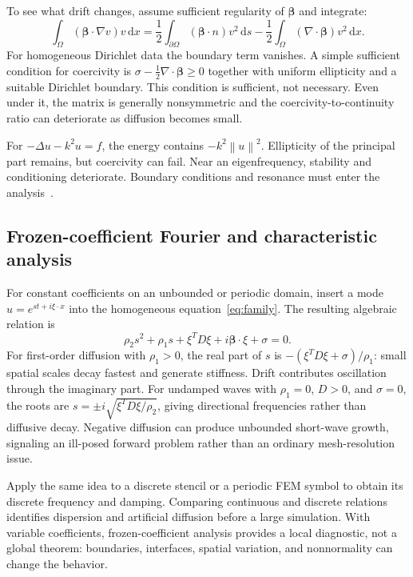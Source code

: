 \documentclass[11pt,a4paper]{article}
\newcommand{\dd}{\,\mathrm{d}}
\newcommand{\norm}[1]{\left\lVert #1\right\rVert}
\begin{document}
To see what drift changes, assume sufficient regularity of $\boldsymbol\beta$ and integrate:
\begin{equation}\label{eq:driftenergy}
\int_\Omega(\boldsymbol\beta\cdot\nabla v)v\dd x
=\frac12\int_{\partial\Omega}(\boldsymbol\beta\cdot n)v^2\dd s
-\frac12\int_\Omega(\nabla\cdot\boldsymbol\beta)v^2\dd x.
\end{equation}
For homogeneous Dirichlet data the boundary term vanishes. A simple sufficient condition for coercivity is $\sigma-\tfrac12\nabla\cdot\boldsymbol\beta\ge0$ together with uniform ellipticity and a suitable Dirichlet boundary. This condition is sufficient, not necessary. Even under it, the matrix is generally nonsymmetric and the coercivity-to-continuity ratio can deteriorate as diffusion becomes small.

For $-\Delta u-k^2u=f$, the energy contains $-k^2\norm{u}^2$. Ellipticity of the principal part remains, but coercivity can fail. Near an eigenfrequency, stability and conditioning deteriorate. Boundary conditions and resonance must enter the analysis~\cite{melenk}.

\subsection{Frozen-coefficient Fourier and characteristic analysis}
For constant coefficients on an unbounded or periodic domain, insert a mode $u=e^{st+i\xi\cdot x}$ into the homogeneous equation~\eqref{eq:family}. The resulting algebraic relation is
\begin{equation}\label{eq:fourier}
\rho_2s^2+\rho_1s+\xi^TD\xi
+i\boldsymbol\beta\cdot\xi+\sigma=0.
\end{equation}
For first-order diffusion with $\rho_1>0$, the real part of $s$ is $-(\xi^TD\xi+\sigma)/\rho_1$: small spatial scales decay fastest and generate stiffness. Drift contributes oscillation through the imaginary part. For undamped waves with $\rho_1=0$, $D>0$, and $\sigma=0$, the roots are $s=\pm i\sqrt{\xi^TD\xi/\rho_2}$, giving directional frequencies rather than diffusive decay. Negative diffusion can produce unbounded short-wave growth, signaling an ill-posed forward problem rather than an ordinary mesh-resolution issue.

Apply the same idea to a discrete stencil or a periodic FEM symbol to obtain its discrete frequency and damping. Comparing continuous and discrete relations identifies dispersion and artificial diffusion before a large simulation. With variable coefficients, frozen-coefficient analysis provides a local diagnostic, not a global theorem: boundaries, interfaces, spatial variation, and nonnormality can change the behavior.
\end{document}
